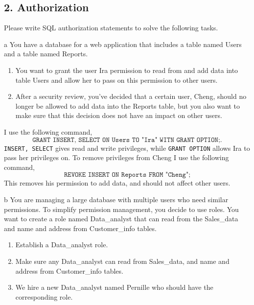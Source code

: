 \documentclass[working, oneside]{../../Preambles/tuftebook}
\begin{document}
\subsection*{2. Authorization}
Please write SQL authorization statements to solve the following tasks.
\begin{subexercise}{a}
You have a database for a web application that includes a table named Users
and a table named Reports.
\begin{enumerate}
    \item  You want to grant the user Ira permission to read from and add data
into table Users and allow her to pass on this permission to other
users.
    \item After a security review, you’ve decided that a certain user, Cheng,
should no longer be allowed to add data into the Reports table, but
you also want to make sure that this decision does not have an impact
on other users.
\end{enumerate}
\end{subexercise}
\begin{solution}
I use the following command,
\[
\texttt{GRANT INSERT, SELECT ON Users TO "Ira" WITN GRANT OPTION;}
.\]
\texttt{INSERT, SELECT} gives read and write privileges, while \texttt{GRANT OPTION} allows Ira to pass her privileges on. To remove privileges from Cheng I use the following command,
\[
\texttt{REVOKE INSERT ON Reports FROM "Cheng";}
\] 
This removes his permission to add data, and should not affect other users.
\end{solution}
\begin{subexercise}{b}
You are managing a large database with multiple users who need similar
permissions. To simplify permission management, you decide to use roles. You
want to create a role named Data\_analyst that can read from the Sales\_data and name and address from Customer\_info tables.
\begin{enumerate}
\item Establish a Data\_analyst role.
\item Make sure any Data\_analyst can read from Sales\_data, and name and address from Customer\_info tables.
\item We hire a new Data\_analyst named Pernille who should have the corresponding role.
\end{enumerate}
\end{subexercise}
\end{document}
